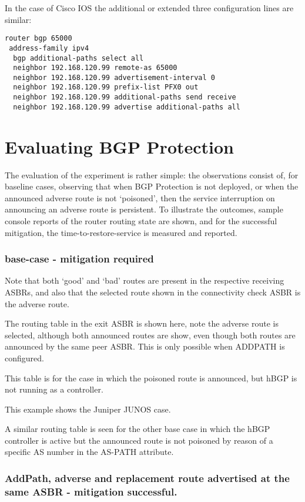 In the case of Cisco IOS the additional or extended three configuration lines are similar:
\begin{verbatim}
router bgp 65000
 address-family ipv4
  bgp additional-paths select all
  neighbor 192.168.120.99 remote-as 65000
  neighbor 192.168.120.99 advertisement-interval 0
  neighbor 192.168.120.99 prefix-list PFX0 out
  neighbor 192.168.120.99 additional-paths send receive
  neighbor 192.168.120.99 advertise additional-paths all
\end{verbatim}

\section{Evaluating BGP Protection}

The evaluation of the experiment is rather simple: the observations consist of, for baseline cases, observing that when BGP Protection is not deployed, or when the announced adverse route is not `poisoned', then the service interruption on announcing an adverse route is persistent.  To illustrate the outcomes, sample console reports of the router routing state are shown, and for the successful mitigation, the time-to-restore-service is measured and reported.

\subsubsection{base-case - mitigation required}

Note that both `good' and `bad' routes are present in the respective receiving ASBRs, and also that the selected route shown in the connectivity check ASBR is the adverse route.

The routing table in the exit ASBR is shown here, note the adverse route is selected, although both announced routes are show, even though both routes are announced by the same peer ASBR.  This is only possible when ADDPATH is configured.

This table is for the case in which the poisoned route is announced, but hBGP is not running as a controller.

This example shows the Juniper JUNOS case.

A similar routing table is seen for the other base case in which the hBGP controller is active but the announced route is not poisoned by reason of a specific AS number in the AS-PATH attribute.

\subsubsection{AddPath, adverse and replacement route advertised at the same ASBR - mitigation successful.}

